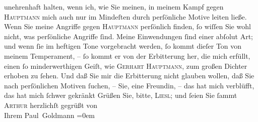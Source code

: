 \begin{ledgroupsized}[t]{13cm}
               unehrenhaft halten, wenn ich, wie Sie meinen, in meinem Kampf gegen \textsc{Hauptmann} mich auch nur im Mindeſten durch perſönliche Motive leiten ließe. Wenn Sie
               meine Angriffe gegen \textsc{Hauptmann} perſönlich {\pb}finden, ſo wiſſen Sie wohl nicht,
               was perſönliche Angriffe ſind. Meine Einwendungen ſind einer abſolut \label{T_L03535-1v}\label{T_L03535-1h} Art; und wenn ſie im heftigen Tone vorgebracht
               werden, ſo kommt dieſer Ton von meinem Temperament, – ſo kommt er von der Erbitterung
               her, die mich erfüllt, einen ſo minderwerthigen Geiſt, wie \textsc{Gerhart Hauptmann}, zum großen Dichter erhoben zu ſehen. Und daß Sie mir die Erbitterung nicht
               glauben wollen, daß Sie nach perſönlichen Motiven ſuchen, – Sie, eine Freundin, – das
               hat mich verblüfft, das hat mich ſchwer gekränkt{\dotsfive}\pend
           \pstart
           Grüßen Sie, bitte, \textsc{Liesl}; und ſeien Sie ſammt \textsc{Arthur} herzlichſt gegrüßt von {\\[\baselineskip]}Ihrem \spacefill\mbox{Paul Goldmann}\pend
           \leftskip=0em{}
         
         \endnumbering{}\end{ledgroupsized}\begin{anhang}\end{anhang}\newcommand{\dateiname}{L03535}\newcommand{\titel}{Paul Goldmann an Olga Gussmann, 15. 11. [1901]}\newcommand{\editorInnen}{Martin Anton Müller und Laura Untner}
      